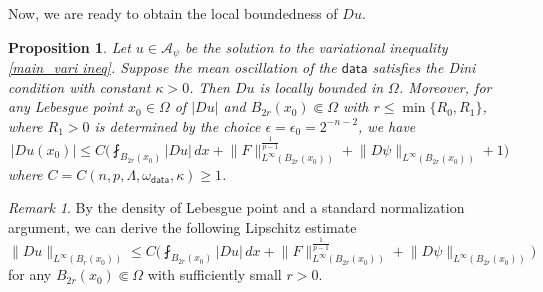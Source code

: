 \documentclass[reqno]{amsart}
\numberwithin{equation}{section}
\theoremstyle{plain}
\newtheorem{proposition}[theorem]{Proposition}
\theoremstyle{definition}
\theoremstyle{remark}
\newtheorem{remark}[theorem]{Remark}
\providecommand{\abs}[1]{\lvert#1\rvert}
\providecommand{\norm}[1]{\lVert#1\rVert}
\begin{document}
Now, we are ready to obtain the local boundedness of $Du$. 



 



\begin{proposition} \label{prop0413mon1}
Let $u\in \mathcal{A}_\psi$ be the solution to the variational inequality \eqref{main_vari ineq}. Suppose the mean oscillation of the $\mathsf{data}$ satisfies the Dini condition with constant $\kappa>0$. 
Then $Du$ is locally bounded in $\Omega$. Moreover,  for any Lebesgue point $x_0\in\Omega$ of $|Du|$ and $B_{2r}(x_0)\Subset \Omega$ with $r\le \min\{R_0,R_1\}$, where $R_1>0$ is determined by the choice $\epsilon=\epsilon_0=2^{-n-2}$,  we have
\begin{equation}\label{eq0413mon1}
|Du(x_0)|\leq C\bigg( \fint_{B_{2r}(x_0)} \abs{Du} \,dx  +   \norm{F}_{L^\infty(B_{2r}(x_0))}
^{\frac{1}{p-1}}+\norm{D\psi}_{L^\infty(B_{2r}(x_0))} +1   \bigg)
\end{equation}
where $C=C(n,p,\Lambda,\omega_\mathsf{data},\kappa)\geq 1$.
\end{proposition}

\begin{remark}
By the density of Lebesgue point and a standard normalization argument, we can derive the following Lipschitz estimate
\[
\norm{Du}_{L^\infty(B_r(x_0))}\leq C\bigg( \fint_{B_{2r}(x_0)} \abs{Du} \,dx  +   \norm{F}_{L^\infty(B_{2r}(x_0))}
^{\frac{1}{p-1}}+\norm{D\psi}_{L^\infty(B_{2r}(x_0))}   \bigg)
\]
for any $B_{2r}(x_0)\Subset\Omega$ with  sufficiently small $r>0$.
\end{remark}
\end{document}
